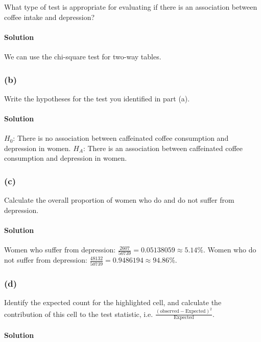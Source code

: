 \documentclass[]{article}
\let\oldparagraph\paragraph
\renewcommand{\paragraph}[1]{\oldparagraph{#1}\mbox{}}
\begin{document}
What type of test is appropriate for evaluating if there is an
association between coffee intake and depression?

\paragraph{Solution}\label{solution-14}

We can use the chi-square test for two-way tables.

\subsubsection{(b)}\label{b-3}

Write the hypotheses for the test you identified in part (a).

\paragraph{Solution}\label{solution-15}

\(H_0\): There is no association between caffeinated coffee consumption
and depression in women. \(H_A\): There is an association between
caffeinated coffee consumption and depression in women.

\subsubsection{(c)}\label{c-2}

Calculate the overall proportion of women who do and do not suffer from
depression.

\paragraph{Solution}\label{solution-16}

Women who suffer from depression:
\(\frac{2607}{50739} = 0.05138059 \approx 5.14\%\). Women who do not
suffer from depression:
\(\frac{48132}{50739} = 0.9486194 \approx 94.86\%\).

\subsubsection{(d)}\label{d-3}

Identify the expected count for the highlighted cell, and calculate the
contribution of this cell to the test statistic, i.e.
\(\frac{(\text{observed} - \text{Expected})^2}{\text{Expected}}\).

\paragraph{Solution}\label{solution-17}
\end{document}
